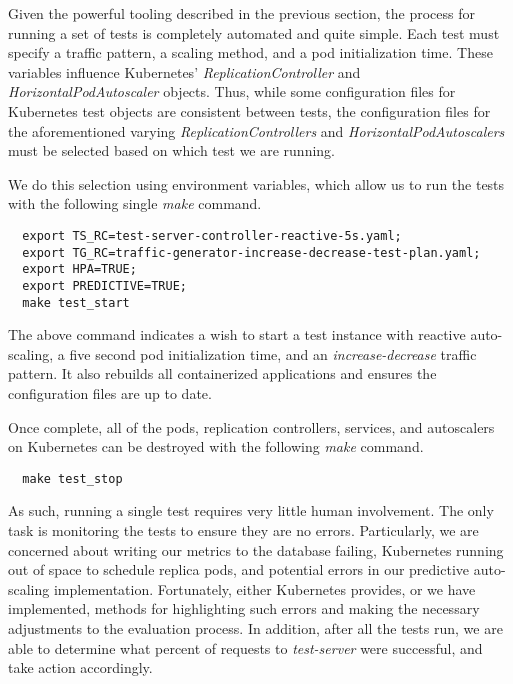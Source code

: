 Given the powerful tooling described in the previous section, the process for
running a set of tests is completely automated and quite simple. Each test
must specify a traffic pattern, a scaling method, and a pod initialization time.
These variables influence Kubernetes' \textit{ReplicationController} and
\textit{HorizontalPodAutoscaler} objects. Thus, while some configuration files
for Kubernetes test objects are consistent between tests, the configuration
files for the aforementioned varying \textit{ReplicationControllers} and
\textit{HorizontalPodAutoscalers} must be selected based on which test we are
running.

We do this selection using environment variables, which allow us to run the
tests with the following single \textit{make} command.

\begin{verbatim}
  export TS_RC=test-server-controller-reactive-5s.yaml;
  export TG_RC=traffic-generator-increase-decrease-test-plan.yaml;
  export HPA=TRUE;
  export PREDICTIVE=TRUE;
  make test_start
\end{verbatim}

The above command indicates a wish to start a test instance with reactive
auto-scaling, a five second pod initialization time, and an
\textit{increase-decrease} traffic pattern. It also rebuilds all containerized
applications and ensures the configuration files are up to date.

Once complete, all of the pods, replication controllers, services, and
autoscalers on Kubernetes can be destroyed with the following \textit{make}
command.

\begin{verbatim}
  make test_stop
\end{verbatim}

As such, running a single test requires very little human involvement. The only
task is monitoring the tests to ensure they are no errors. Particularly, we are
concerned about writing our metrics to the database failing, Kubernetes
running out of space to schedule replica pods, and potential errors in our
predictive auto-scaling implementation. Fortunately, either Kubernetes provides,
or we have implemented, methods for highlighting such errors and making the
necessary adjustments to the evaluation process. In addition, after all the
tests run, we are able to determine what percent of requests to
\textit{test-server} were successful, and take action accordingly.
